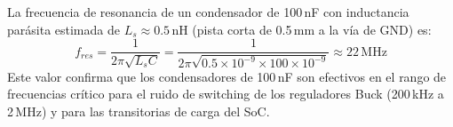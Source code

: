 La frecuencia de resonancia de un condensador de 100\,nF con inductancia parásita estimada de $L_s \approx 0.5\,\text{nH}$ (pista corta de 0.5\,mm a la vía de GND) es:
\[
  f_{res} = \frac{1}{2\pi\sqrt{L_s C}} = \frac{1}{2\pi\sqrt{0.5\times10^{-9} \times 100\times10^{-9}}} \approx 22\,\text{MHz}
\]
Este valor confirma que los condensadores de 100\,nF son efectivos en el rango de frecuencias crítico para el ruido de switching de los reguladores Buck (200\,kHz a 2\,MHz) y para las transitorias de carga del SoC.
